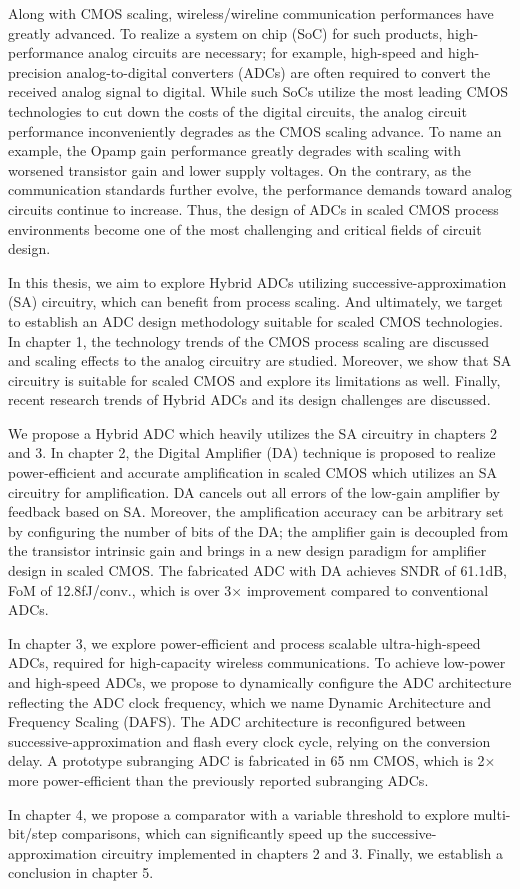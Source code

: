 Along with CMOS scaling, wireless/wireline communication performances have greatly advanced.
To realize a system on chip (SoC) for such products, high-performance analog circuits are necessary; for example, high-speed and high-precision analog-to-digital converters (ADCs) are often required to convert the received analog signal to digital. 
While such SoCs utilize the most leading CMOS technologies to cut down the costs of the digital circuits, the analog circuit performance inconveniently degrades as the CMOS scaling advance. To name an example, the Opamp gain performance greatly degrades with scaling with worsened transistor gain and lower supply voltages.
On the contrary, as the communication standards further evolve, the performance demands toward analog circuits continue to increase.
Thus, the design of ADCs in scaled CMOS process environments become one of the most challenging and critical fields of circuit design.

In this thesis, we aim to explore Hybrid ADCs utilizing successive-approximation (SA) circuitry, which can benefit from process scaling. And ultimately, we target to establish an ADC design methodology suitable for scaled CMOS technologies. In chapter 1, the technology trends of the CMOS process scaling are discussed and scaling effects to the analog circuitry are studied. Moreover, we show that SA circuitry is suitable for scaled CMOS and explore its limitations as well. Finally, recent research trends of Hybrid ADCs and its design challenges are discussed.

We propose a Hybrid ADC which heavily utilizes the SA circuitry in chapters 2 and 3. In chapter 2, the Digital Amplifier (DA) technique is proposed to realize power-efficient and accurate amplification in scaled CMOS which utilizes an SA circuitry for amplification. DA cancels out all errors of the low-gain amplifier by feedback based on SA. Moreover, the amplification accuracy can be arbitrary set by configuring the number of bits of the DA; the amplifier gain is decoupled from the transistor intrinsic gain and brings in a new design paradigm for amplifier design in scaled CMOS. The fabricated ADC with DA achieves SNDR of 61.1dB, FoM of 12.8fJ/conv., which is over 3$\times$ improvement compared to conventional ADCs.

In chapter 3, we explore power-efficient and process scalable ultra-high-speed ADCs, required for high-capacity wireless communications.
To achieve low-power and high-speed ADCs, we propose to dynamically configure the ADC architecture reflecting the ADC clock frequency, which we name Dynamic Architecture and Frequency Scaling (DAFS).
The ADC architecture is reconfigured between successive-approximation and flash every clock cycle, relying on the conversion delay. 
A prototype subranging ADC is fabricated in 65 nm CMOS, which is 2$\times$ more power-efficient than the previously reported subranging ADCs.

In chapter 4, we propose a comparator with a variable threshold to explore multi-bit/step comparisons, which can significantly speed up the successive-approximation circuitry implemented in chapters 2 and 3. Finally, we establish a conclusion in chapter 5.